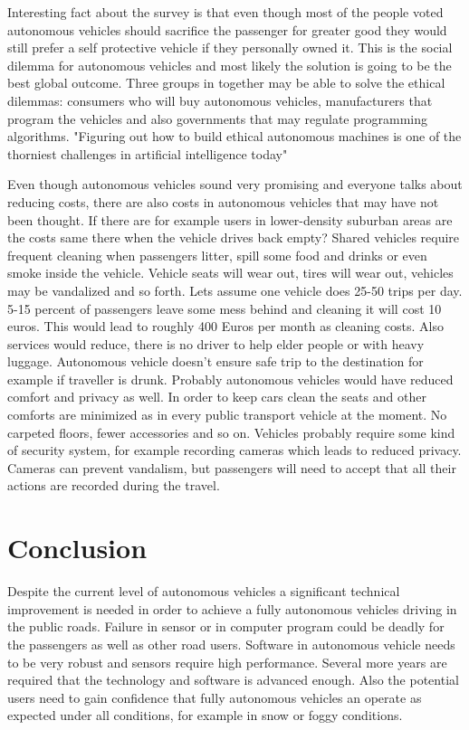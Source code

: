 \documentclass[english]{tktltiki}
\begin{document}
Interesting fact about the survey is that even though most of the people voted 
autonomous vehicles should sacrifice the passenger for greater good they would 
still prefer a self protective vehicle if they personally owned it. 
\cite{dilemma} This is the social dilemma for autonomous vehicles and most 
likely the solution is going to be the best global outcome. Three groups in 
together may be able to solve the ethical dilemmas: \cite{differences} consumers who will buy 
autonomous vehicles, manufacturers that program the vehicles and also 
governments that may regulate programming algorithms. "Figuring out how to build 
ethical autonomous machines is one of the thorniest challenges in artificial 
intelligence today"

Even though autonomous vehicles sound very promising and everyone talks about 
reducing costs, there are also costs in autonomous vehicles that may have not 
been thought. If there are for example users in lower-density suburban areas are 
the costs same there when the vehicle drives back empty? Shared vehicles require 
frequent cleaning when passengers litter, spill some food and drinks or even 
smoke inside the vehicle. Vehicle seats will wear out, tires will wear out, 
vehicles may be vandalized and so forth. Lets assume one vehicle does 25-50 
trips per day. 5-15 percent of passengers leave some mess behind and cleaning it 
will cost 10 euros. This would lead to roughly 400 Euros per month as cleaning 
costs. Also services would reduce, there is no driver to help elder people or 
with heavy luggage. Autonomous vehicle doesn't ensure safe trip to the 
destination for example if traveller is drunk. Probably autonomous vehicles 
would have reduced comfort and privacy as well. In order to keep cars clean the 
seats and other comforts are minimized as in every public transport vehicle at 
the moment. No carpeted floors, fewer accessories and so on. Vehicles probably 
require some kind of security system, for example recording cameras which leads 
to reduced privacy. Cameras can prevent vandalism, but passengers will need to 
accept that all their actions are recorded during the travel. 


\section{Conclusion}
Despite the current level of autonomous vehicles a significant technical 
improvement is needed in order to achieve a fully autonomous vehicles driving in 
the public roads. \cite{transportpolicy} Failure in sensor or in computer 
program could be deadly for the passengers as well as other road users. Software 
in autonomous vehicle needs to be very robust and sensors require high 
performance. Several more years are required that the technology and software is 
advanced enough. Also the potential users need to gain confidence that fully 
autonomous vehicles an operate as expected under all conditions, for example in 
snow or foggy conditions. 
\end{document}
